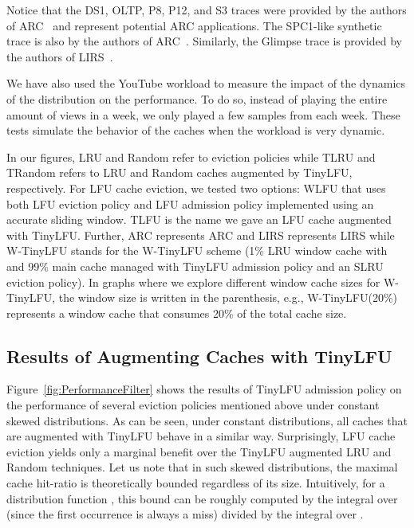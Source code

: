 \documentclass[10pt,a4paper]{article}
\begin{document}
Notice that the DS1, OLTP, P8, P12, and S3 traces were provided by the authors of ARC~\cite{ARC} and represent potential ARC applications.
The SPC1-like synthetic trace is also by the authors of ARC~\cite{ARC}.
Similarly, the Glimpse trace is provided by the authors of LIRS~\cite{LIRS}.







We have also used the YouTube workload to measure the impact of the dynamics of the distribution on the performance.
To do so, instead of playing the entire amount of views in a week, we only played a few samples from each week.
These tests simulate the behavior of the caches when the workload is very dynamic.

In our figures, LRU and Random refer to eviction policies while TLRU and TRandom refers to LRU and Random caches augmented by TinyLFU, respectively.
For LFU cache eviction, we tested two options: WLFU that uses both LFU eviction policy and LFU admission policy implemented using an accurate sliding window.
TLFU is the name we gave an LFU cache augmented with TinyLFU.
Further, ARC represents ARC and LIRS represents LIRS while W-TinyLFU stands for the W-TinyLFU scheme (1\% LRU window cache with and 99\% main cache managed with TinyLFU admission policy and an SLRU eviction policy).
In graphs where we explore different window cache sizes for W-TinyLFU, the window size is written in the parenthesis, e.g., W-TinyLFU(20\%) represents a window cache that consumes 20\% of the total cache size.





\subsection{Results of Augmenting Caches with TinyLFU}
\label{sec:simulator}

Figure~\ref{fig:PerformanceFilter} shows the results of TinyLFU admission policy on the performance of several eviction policies mentioned above under constant skewed distributions.
As can be seen, under constant distributions, all caches that are augmented with TinyLFU behave in a similar way.
Surprisingly, LFU cache eviction yields only a marginal benefit over the TinyLFU augmented LRU and Random techniques.
Let us note that in such skewed distributions, the maximal cache hit-ratio is theoretically bounded regardless of its size.
Intuitively, for a distribution function , this bound can be roughly computed by the integral over  (since the first occurrence is always a miss)
divided by the integral over .
\end{document}
